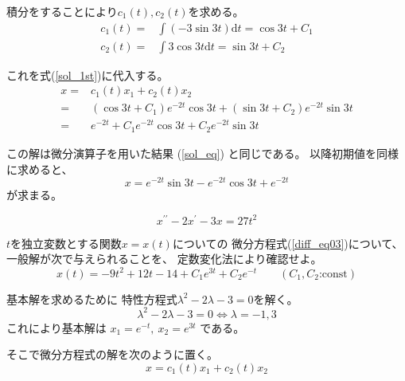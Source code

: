 \documentclass[12pt,b5paper]{ltjsarticle}
\begin{document}
\begin{enumerate}
      積分をすることにより$c_1(t),c_2(t)$を求める。
      \begin{align}
       c_1(t) =& \int (-3\sin{3t})\mathrm{d}t = \cos{3t} + C_1\\
       c_2(t) =& \int 3\cos{3t}\mathrm{d}t = \sin{3t} + C_2
      \end{align}

      これを式(\ref{sol_1st})に代入する。
      \begin{align}
       x =& c_1(t)x_1 + c_2(t)x_2\\
        =& (\cos{3t} + C_1)e^{- 2t} \cos{3t}
        +(\sin{3t} + C_2)e^{- 2t} \sin{3t}\\
       =& e^{- 2t} 
       +C_1e^{- 2t} \cos{3t} + C_2e^{- 2t} \sin{3t}
      \end{align}

      この解は微分演算子を用いた結果
      (\ref{sol_eq})
      と同じである。
      以降初期値を同様に求めると、
      \begin{equation}
       x = e^{- 2t} \sin{3t} - e^{- 2t} \cos{3t} + e^{-2t}
      \end{equation}
      が求まる。


      \hrulefill

\end{enumerate}


\hrulefill

\begin{equation}
 x^{\prime\prime}- 2x^{\prime}-3x=27t^2
  \label{diff_eq03}
\end{equation}

$t$を独立変数とする関数$x=x(t)$についての
微分方程式(\ref{diff_eq03})について、
一般解が次で与えられることを、
定数変化法により確認せよ。
\begin{equation}
 x(t)=-9t^2+12t-14+C_1e^{3t}+C_2e^{-t}
  \qquad
  (C_1,C_2\text{:const})
\end{equation}

\dotfill


基本解を求めるために
特性方程式$\lambda^2-2\lambda-3=0$を解く。
\begin{equation}
 \lambda^2-2\lambda-3=0
  \Leftrightarrow
  \lambda = -1,3
\end{equation}
これにより基本解は
$x_1=e^{-t}, \ x_2=e^{3t}$
である。

そこで微分方程式の解を次のように置く。
\begin{equation}
 x=c_1(t)x_1+c_2(t)x_2
  \label{sol_2nd}
\end{equation}
\end{document}
